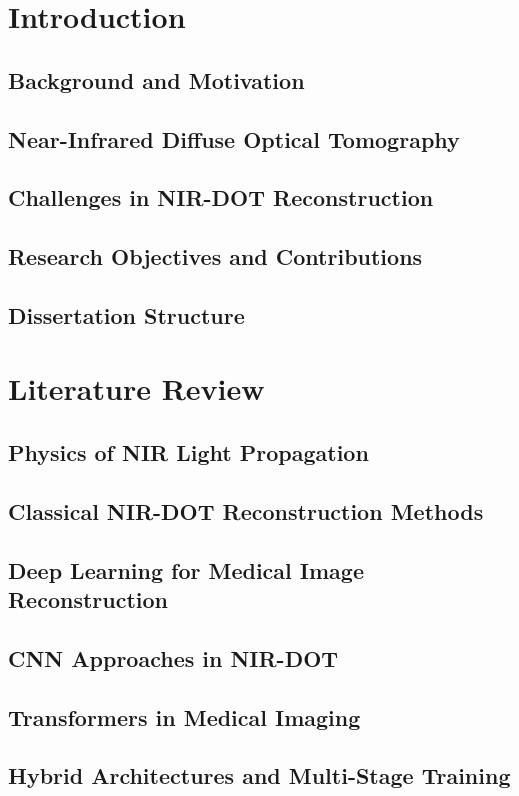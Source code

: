 \documentclass[12pt,a4paper]{report}
\begin{document}
\tableofcontents
\listoffigures
\listoftables

\chapter{Introduction}
\section{Background and Motivation}
\section{Near-Infrared Diffuse Optical Tomography}
\section{Challenges in NIR-DOT Reconstruction}
\section{Research Objectives and Contributions}
\section{Dissertation Structure}

\chapter{Literature Review}
\section{Physics of NIR Light Propagation}
\section{Classical NIR-DOT Reconstruction Methods}
\section{Deep Learning for Medical Image Reconstruction}
\section{CNN Approaches in NIR-DOT}
\section{Transformers in Medical Imaging}
\section{Hybrid Architectures and Multi-Stage Training}
\end{document}
